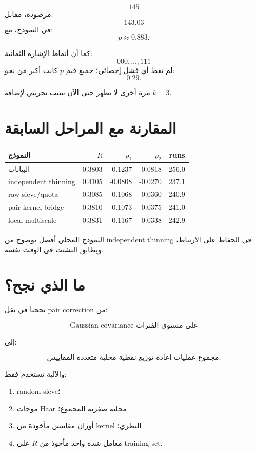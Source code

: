 \documentclass[12pt]{article}
\begin{document}
\[
145
\]
مرصودة، مقابل:
\[
143.03
\]
في النموذج، مع:
\[
p\approx0.883.
\]

كما أن أنماط الإشارة الثمانية:
\[
000,\ldots,111
\]
لم تعط أي فشل إحصائي؛ جميع قيم \(p\) كانت أكبر من نحو:
\[
0.29.
\]

مرة أخرى لا يظهر حتى الآن سبب تجريبي لإضافة \(k=3\).

\section{المقارنة مع المراحل السابقة}

\begin{center}
\begin{tabular}{lrrrr}
\toprule
النموذج & \(R\) & \(\rho_1\) & \(\rho_2\) & runs\\
\midrule
البيانات & 0.3803 & -0.1237 & -0.0818 & 256.0\\
independent thinning & 0.4105 & -0.0808 & -0.0270 & 237.1\\
raw sieve/quota & 0.3085 & -0.1068 & -0.0360 & 240.9\\
pair-kernel bridge & 0.3810 & -0.1073 & -0.0375 & 241.0\\
local multiscale & 0.3831 & -0.1167 & -0.0338 & 242.9\\
\bottomrule
\end{tabular}
\end{center}

النموذج المحلي أفضل بوضوح من independent thinning في الحفاظ على
الارتباط، ويطابق التشتت في الوقت نفسه.

\section{ما الذي نجح؟}

نجحنا في نقل pair correction من:

\[
\text{Gaussian covariance على مستوى الفترات}
\]

إلى:

\[
\boxed{
\text{مجموع عمليات إعادة توزيع نقطية محلية متعددة المقاييس.}
}
\]

والآلية تستخدم فقط:

\begin{enumerate}
\item random sieve؛
\item موجات Haar محلية صفرية المجموع؛
\item أوزان مقاييس مأخوذة من kernel النظري؛
\item معامل شدة واحد مأخوذ من \(R\) على training set.
\end{enumerate}
\end{document}

